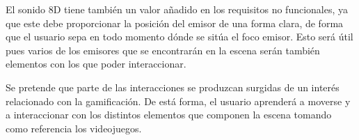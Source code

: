 \quad El sonido 8D tiene también un valor añadido en los requisitos no funcionales, ya que este debe proporcionar la posición del emisor de una forma clara, de forma que el usuario sepa en todo momento dónde se sitúa el foco emisor. Esto será útil pues varios de los emisores que se encontrarán en la escena serán también elementos con los que poder interaccionar.\\


\quad Se pretende que parte de las interacciones se produzcan surgidas de un interés relacionado con la gamificación. De está forma, el usuario aprenderá a moverse y a interaccionar con los distintos elementos que componen la escena tomando como referencia los videojuegos.\\



\newpage



